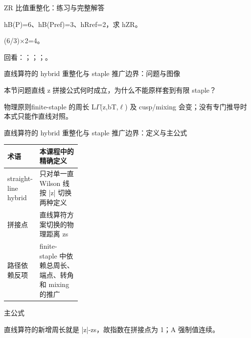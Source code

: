 \begin{frame}[t]{ZR 比值重整化：练习与完整解答}
\footnotesize
\begin{block}{}hB(P)=6、hB(Pref)=3、hRref=2，求 hZR。\end{block}
\begin{exampleblock}{}(6/\allowbreak{}3)\ensuremath{\times}2=4。\end{exampleblock}
\vfill
\scriptsize 回看：；；；。
\end{frame}

\begin{frame}[t]{直线算符的 hybrid 重整化与 staple 推广边界：问题与图像}
\footnotesize
\begin{block}{本节问题}直线 z 拼接公式何时成立，为什么不能原样套到有限 staple？\end{block}
\begin{block}{物理原则}\quad finite-staple 的周长 L\ensuremath{\Gamma}(z,bT,\ensuremath{\ell}) 及 cusp/\allowbreak{}mixing 会变；没有专门推导时本式只能作直线对照。\end{block}
\end{frame}

\begin{frame}[t]{直线算符的 hybrid 重整化与 staple 推广边界：定义与主公式}
\footnotesize\begin{tabularx}{\linewidth}{p{0.30\linewidth}Y}
\toprule 术语 & 本课程中的精确定义\\\midrule
{} straight-line hybrid & 只对单一直 Wilson 线按 |z| 切换两种定义\\
 拼接点 & 直线算符方案切换的物理距离 zs\\
 路径依赖反项 & finite-staple 中依赖总周长、端点、转角和 mixing 的推广\\
\bottomrule\end{tabularx}\vspace{0.15cm}
\begin{block}{ 主公式}\centering{}\end{block}
直线算符的新增周长就是 |z|-zs，故指数在拼接点为 1；A 强制值连续。
\end{frame}

